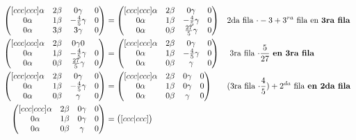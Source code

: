 \documentclass[letterpaper]{article}
\renewcommand{\*}{\cdot}
\theoremstyle{definition}
\begin{document}
		\begin{align*}
		\begin{pmatrix}[ccc|ccc]
		\alpha & 2\beta & 0\gamma & 0\\
		0\alpha & 1\beta & -\frac{4}{5}\gamma& 0\\
		0\alpha & 3\beta & 3\gamma & 0
		\end{pmatrix} &= \begin{pmatrix}[ccc|ccc]
		\alpha & 2\beta & 0\gamma & 0\\
		0\alpha & 1\beta & -\frac{4}{5}\gamma& 0\\
		0\alpha & 0\beta & \frac{27}{5}\gamma & 0
		\end{pmatrix} && \text{2da fila $ \* -3  +  3^{ra}$ fila en \textbf{3ra fila}}\\
		\begin{pmatrix}[ccc|ccc]
		\alpha & 2\beta & 0\gamma 0\\
		0\alpha & 1\beta & -\frac{4}{5}\gamma& 0\\
		0\alpha & 0\beta & \frac{27}{5}\gamma & 0
		\end{pmatrix} & = \begin{pmatrix}[ccc|ccc]
		\alpha & 2\beta & 0\gamma & 0\\
		0\alpha & 1\beta & -\frac{4}{5}\gamma& 0\\
		0\alpha & 0\beta & \gamma & 0
		\end{pmatrix} && \text{ 3ra fila $ \* \frac{5}{27}$ \textbf{en 3ra fila} }\\
		\begin{pmatrix}[ccc|ccc]
		\alpha & 2\beta & 0\gamma & 0\\
		0\alpha & 1\beta & -\frac{4}{5}\gamma& 0\\
		0\alpha & 0\beta & \gamma &0
		\end{pmatrix} &= \begin{pmatrix}[ccc|ccc]
		\alpha & 2\beta & 0\gamma & 0\\
		0\alpha & 1\beta & 0\gamma& 0\\
		0\alpha & 0\beta & \gamma & 0
		\end{pmatrix} && \text{(3ra fila $ \* \dfrac{4}{5}) + 2^{da} $  fila \textbf{en 2da fila} }\\
		\begin{pmatrix}[ccc|ccc]
		\alpha & 2\beta & 0\gamma & 0\\
		0\alpha & 1\beta & 0\gamma& 0\\
		0\alpha & 0\beta & \gamma & 0
		\end{pmatrix} & = \begin{pmatrix}[ccc|ccc]

\end{pmatrix}
\end{align*}
\end{document}
